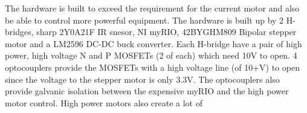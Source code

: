 The hardware is built to exceed the requirement for the current motor and also be able to control more powerful equipment. \newline
The hardware is built up by 2 H-bridges, sharp 2Y0A21F IR snesor, NI myRIO, 42BYGHM809 Bipolar stepper motor and a LM2596 DC-DC buck converter. 
Each H-bridge have a pair of high power, high voltage N and P MOSFETs (2 of each) which need 10V to open. 4 optocouplers provide the MOSFETs with a high voltage line (of 10+V) to open since the voltage to the stepper motor is only 3.3V. The optocouplers also provide galvanic isolation between the expensive myRIO and the high power motor control. %
High power motors also create a lot of 